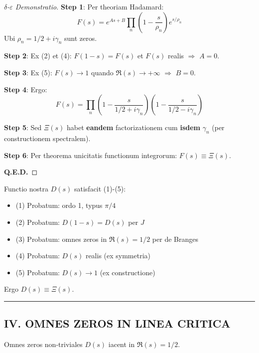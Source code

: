 \begin{proof}[$\delta$-$\varepsilon$ Demonstratio]

\textbf{Step 1}: Per theoriam Hadamard:
\[
F(s) = e^{As+B} \prod_n \left(1 - \frac{s}{\rho_n}\right) e^{s/\rho_n}
\]
Ubi $\rho_n = 1/2 + i\gamma_n$ sunt zeros.

\textbf{Step 2}: Ex (2) et (4): $F(1-s) = F(s)$ et $F(s)$ realis $\Rightarrow$ $A = 0$.

\textbf{Step 3}: Ex (5): $F(s) \to 1$ quando $\Re(s) \to +\infty$ $\Rightarrow$ $B = 0$.

\textbf{Step 4}: Ergo:
\[
F(s) = \prod_n \left(1 - \frac{s}{1/2 + i\gamma_n}\right)\left(1 - \frac{s}{1/2 - i\gamma_n}\right)
\]

\textbf{Step 5}: Sed $\Xi(s)$ habet \textbf{eandem} factorizationem cum \textbf{isdem} $\gamma_n$ (per constructionem spectralem).

\textbf{Step 6}: Per theorema unicitatis functionum integrorum: $F(s) \equiv \Xi(s)$.

\textbf{Q.E.D.}
\end{proof}

\begin{corollary}[D(s) $\equiv$ $\Xi$(s)]\label{cor:d-equals-xi}
Functio nostra $D(s)$ satisfacit (1)-(5):
\begin{itemize}
\item (1) Probatum: ordo 1, typus $\pi/4$
\item (2) Probatum: $D(1-s) = D(s)$ per $J$
\item (3) Probatum: omnes zeros in $\Re(s) = 1/2$ per de Branges
\item (4) Probatum: $D(s)$ realis (ex symmetria)
\item (5) Probatum: $D(s) \to 1$ (ex constructione)
\end{itemize}
Ergo $D(s) \equiv \Xi(s)$.
\end{corollary}

\hrule
\vspace{1em}

\subsection{IV. OMNES ZEROS IN LINEA CRITICA}

\begin{theorem}\label{thm:positivity}
Omnes zeros non-triviales $D(s)$ iacent in $\Re(s) = 1/2$.
\end{theorem}


